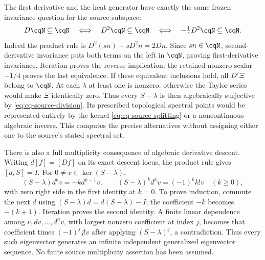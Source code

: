 The first derivative and the heat generator have exactly the same
frozen invariance question for the source subspace:
\begin{equation}\label{eq:cq-source-D-equivalence}
 D\cqN\subseteq\cqN
 \quad\Longleftrightarrow\quad D^2\cqN\subseteq\cqN
 \quad\Longleftrightarrow\quad -\tfrac14D^2\cqN\subseteq\cqN.
\end{equation}
Indeed the product rule is
$D^2(sn)-sD^2n=2Dn$. Since $sn\in\cqN$, second-derivative
invariance puts both terms on the left in $\cqN$, proving
first-derivative invariance. Iteration proves the reverse implication;
the retained nonzero scalar $-1/4$ proves the last equivalence.
If these equivalent inclusions hold, all $D^j\Xi$ belong to
$\cqN$. At each $\lambda$ at least one is nonzero: otherwise
the Taylor series would make $\Xi$ identically zero. Thus every
$S-\lambda$ is then algebraically surjective by
\eqref{eq:cq-source-division}. Its prescribed topological spectral
points would be represented entirely by the kernel
\eqref{eq:cq-source-splitting} or a noncontinuous algebraic inverse.
This computes the precise alternatives without assigning either
one to the source's stated spectral set.

There is also a full multiplicity consequence of algebraic derivative
descent. Writing $d[f]=[Df]$ on its exact descent locus, the product
rule gives $[d,S]=I$. For $0\ne v\in\ker(S-\lambda)$,
\begin{equation}\label{eq:cq-source-weylladder}
 (S-\lambda)d^kv=-k d^{k-1}v,
 \qquad (S-\lambda)^kd^kv=(-1)^k k!v\quad(k\geq0),
\end{equation}
with zero right side in the first identity at $k=0$.
To prove induction, commute the next $d$ using
$(S-\lambda)d=d(S-\lambda)-I$; the coefficient $-k$ becomes
$-(k+1)$. Iteration proves the second identity. A finite linear
dependence among $v,dv,\ldots,d^nv$, with largest nonzero
coefficient at index $j$, becomes that coefficient times
$(-1)^j j!v$ after applying $(S-\lambda)^j$, a contradiction.
Thus every such eigenvector generates an infinite independent
generalized eigenvector sequence. No finite source multiplicity
assertion has been assumed.

